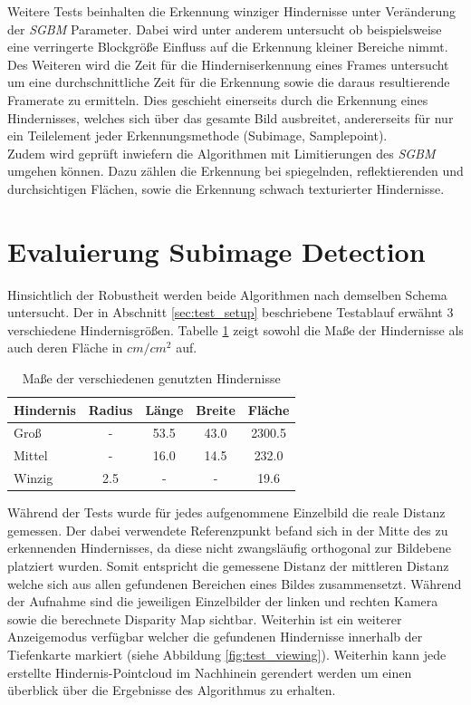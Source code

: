 \noindent
Weitere Tests beinhalten die Erkennung winziger Hindernisse unter Veränderung der \emph{SGBM} Parameter. Dabei wird unter anderem untersucht ob beispielsweise eine verringerte Blockgröße Einfluss auf die Erkennung kleiner Bereiche nimmt. Des Weiteren wird die Zeit für die Hinderniserkennung eines Frames untersucht um eine durchschnittliche Zeit für die Erkennung sowie die daraus resultierende Framerate zu ermitteln. Dies geschieht einerseits durch die Erkennung eines Hindernisses, welches sich über das gesamte Bild ausbreitet, andererseits für nur ein Teilelement jeder Erkennungsmethode (Subimage, Samplepoint).\\
Zudem wird geprüft inwiefern die Algorithmen mit Limitierungen des \emph{SGBM} umgehen können. Dazu zählen die Erkennung bei spiegelnden, reflektierenden und durchsichtigen Flächen, sowie die Erkennung schwach texturierter Hindernisse.\\

\section{Evaluierung Subimage Detection}
\label{sec:evaluierung_subimage}

    Hinsichtlich der Robustheit werden beide Algorithmen nach demselben Schema untersucht. Der in Abschnitt \ref{sec:test_setup} beschriebene Testablauf erwähnt 3 verschiedene Hindernisgrößen. Tabelle \ref{tbl:obstacle_sizes} zeigt sowohl die Maße der Hindernisse als auch deren Fläche in $cm/cm^2$ auf.
    
	\begin{table}[h]
	\centering
	\begin{tabular}{|l|c|c|c|c|}
	\hline
	Hindernis   & Radius & Länge & Breite & Fläche \\
	\hline
	Groß   		&   -    & 53.5  & 43.0   & 2300.5 \\
	\hline
	Mittel 		& 	-    & 16.0  & 14.5   & 232.0\\
	\hline
	Winzig		& 2.5	 &   -   &   -    & 19.6 \\
	\hline	
	\end{tabular}
	\label{tbl:obstacle_sizes}
	\caption{Maße der verschiedenen genutzten Hindernisse}
	\end{table}
	
	\noindent
	Während der Tests wurde für jedes aufgenommene Einzelbild die reale Distanz gemessen. Der dabei verwendete Referenzpunkt befand sich in der Mitte des zu erkennenden Hindernisses, da diese nicht zwangsläufig orthogonal zur Bildebene platziert wurden. Somit entspricht die gemessene Distanz der mittleren Distanz welche sich aus allen gefundenen Bereichen eines Bildes zusammensetzt. Während der Aufnahme sind die jeweiligen Einzelbilder der linken und rechten Kamera sowie die berechnete Disparity Map sichtbar. Weiterhin ist ein weiterer Anzeigemodus verfügbar welcher die gefundenen Hindernisse innerhalb der Tiefenkarte markiert (siehe Abbildung \ref{fig:test_viewing}). Weiterhin kann jede erstellte Hindernis-Pointcloud im Nachhinein gerendert werden um einen überblick über die Ergebnisse des Algorithmus zu erhalten.\\
	
